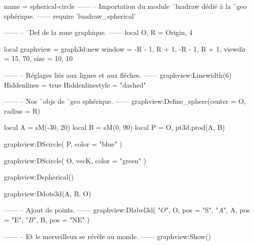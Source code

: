 \documentclass{standalone}
\begin{document}
\begin{luadraw}{name = spherical-circle}
------
-- Importation du module ¨luadraw dédié à la ¨geo sphérique.
------
require 'luadraw_spherical'

------
-- ¨Def de la zone graphique.
------
local O, R = Origin, 4

local graphview = graph3d:new{
  window  = {-R - 1, R + 1, -R - 1, R + 1},
  viewdir = {15, 70},
  size    = {10, 10}
}

------
-- Réglages liés aux lignes et aux flèches.
------
graphview:Linewidth(6)
Hiddenlines     = true
Hiddenlinestyle = "dashed"

------
-- Nos ¨objs de ¨geo sphérique.
------
graphview:Define_sphere({center = O, radius = R})

local A = sM(-30, 20)
local B = sM(0, 90)
local P = {O, pt3d.prod(A, B)}

graphview:DScircle(
  P,
  {color = "blue"}
)

graphview:DScircle(
  {O, vecK},
  {color = "green"}
)

graphview:Dspherical()

graphview:Ddots3d({A, B, O})

------
-- Ajout de points.
------
graphview:Dlabel3d(
  "$O$", O, {pos = "S"},
  "$A$", A, {pos = "E"},
  "$B$", B, {pos = "NE"}
)

------
-- Et le merveilleux se révèle au monde.
------
graphview:Show()
\end{luadraw}
\end{document}
